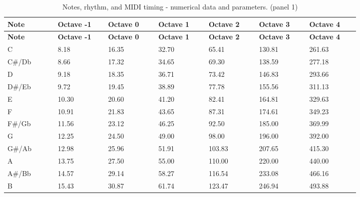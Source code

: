 \documentclass[11pt,a4paper]{article}
\begin{document}
\begingroup\small\setlength{\tabcolsep}{3pt}\renewcommand{\arraystretch}{1.18}\begin{longtable}{@{}p{0.1171\linewidth}p{0.1171\linewidth}p{0.1171\linewidth}p{0.1171\linewidth}p{0.1171\linewidth}p{0.1171\linewidth}p{0.1171\linewidth}@{}}
\caption{Notes, rhythm, and MIDI timing - numerical data and parameters. (panel 1)}\label{tab:010_p004_table10}\\\toprule
\textbf{Note} & \textbf{Octave -1} & \textbf{Octave 0} & \textbf{Octave 1} & \textbf{Octave 2} & \textbf{Octave 3} & \textbf{Octave 4} \\ \midrule\endfirsthead \textbf{Note} & \textbf{Octave -1} & \textbf{Octave 0} & \textbf{Octave 1} & \textbf{Octave 2} & \textbf{Octave 3} & \textbf{Octave 4} \\ \midrule\endhead
C & 8.18 & 16.35 & 32.70 & 65.41 & 130.81 & 261.63 \\
C\#/\allowbreak{}Db & 8.66 & 17.32 & 34.65 & 69.30 & 138.59 & 277.18 \\
D & 9.18 & 18.35 & 36.71 & 73.42 & 146.83 & 293.66 \\
D\#/\allowbreak{}Eb & 9.72 & 19.45 & 38.89 & 77.78 & 155.56 & 311.13 \\
E & 10.30 & 20.60 & 41.20 & 82.41 & 164.81 & 329.63 \\
F & 10.91 & 21.83 & 43.65 & 87.31 & 174.61 & 349.23 \\
F\#/\allowbreak{}Gb & 11.56 & 23.12 & 46.25 & 92.50 & 185.00 & 369.99 \\
G & 12.25 & 24.50 & 49.00 & 98.00 & 196.00 & 392.00 \\
G\#/\allowbreak{}Ab & 12.98 & 25.96 & 51.91 & 103.83 & 207.65 & 415.30 \\
A & 13.75 & 27.50 & 55.00 & 110.00 & 220.00 & 440.00 \\
A\#/\allowbreak{}Bb & 14.57 & 29.14 & 58.27 & 116.54 & 233.08 & 466.16 \\
B & 15.43 & 30.87 & 61.74 & 123.47 & 246.94 & 493.88 \\
\bottomrule\end{longtable}\endgroup
\end{document}

